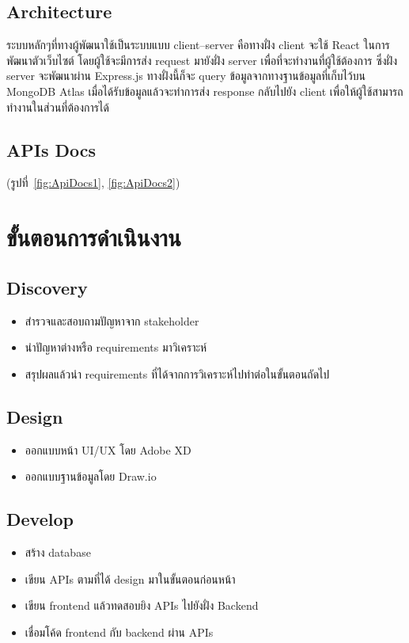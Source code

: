 \subsection{Architecture}

ระบบหลักๆที่ทางผู้พัฒนาใช้เป็นระบบแบบ client--server คือทางฝั่ง client จะใช้ React ในการพัฒนาตัวเว็บไซต์ โดยผู้ใช้จะมีการส่ง request มายังฝั่ง server เพื่อที่จะทำงานที่ผู้ใช้ต้องการ ซึ่งฝั่ง server 
จะพัฒนาผ่าน Express.js ทางฝั่งนี้ก็จะ query ข้อมูลจากทางฐานข้อมูลที่เก็บไว้บน MongoDB Atlas เมื่อได้รับข้อมูลแล้วจะทำการส่ง response กลับไปยัง client เพื่อให้ผู้ใช้สามารถทำงานในส่วนที่ต้องการได้

\subsection{APIs Docs}
(รูปที่~\ref{fig:ApiDocs1}, \ref{fig:ApiDocs2})
\section{ขั้นตอนการดำเนินงาน}
\subsection{Discovery}
\begin{itemize}
  \item สำรวจและสอบถามปัญหาจาก stakeholder
  \item นำปัญหาต่างหรือ requirements มาวิเคราะห์
  \item สรุปผลแล้วนำ requirements ที่ได้จากการวิเคราะห์ไปทำต่อในขั้นตอนถัดไป
\end{itemize}

\subsection{Design}
\begin{itemize}
  \item ออกแบบหน้า UI/UX โดย Adobe XD
  \item ออกแบบฐานข้อมูลโดย Draw.io
\end{itemize}

\subsection{Develop}
\begin{itemize}
  \item สร้าง database
  \item เขียน APIs ตามที่ได้ design มาในขั้นตอนก่อนหน้า
  \item เขียน frontend แล้วทดสอบยิง APIs ไปยังฝั่ง Backend
  \item เชื่อมโค้ด frontend กับ backend ผ่าน APIs
\end{itemize}

